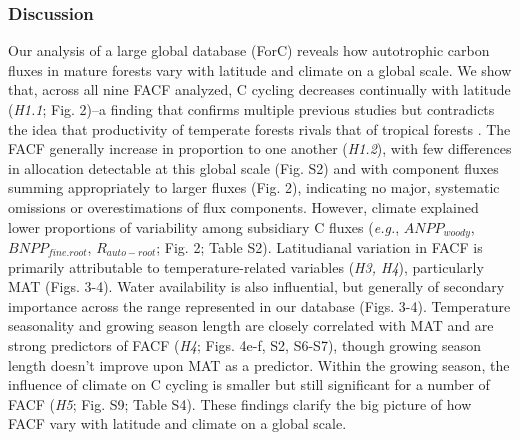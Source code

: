 \documentclass[]{article}
\begin{document}
\subsubsection{Discussion}\label{discussion}

Our analysis of a large global database (ForC) reveals how autotrophic
carbon fluxes in mature forests vary with latitude and climate on a
global scale. We show that, across all nine FACF analyzed, C cycling
decreases continually with latitude (\emph{H1.1}; Fig. 2)--a finding
that confirms multiple previous studies but contradicts the idea that
productivity of temperate forests rivals that of tropical forests
\citep{huston_global_2009}. The FACF generally increase in proportion to
one another (\emph{H1.2}), with few differences in allocation detectable
at this global scale (Fig. S2) and with component fluxes summing
appropriately to larger fluxes (Fig. 2), indicating no major, systematic
omissions or overestimations of flux components. However, climate
explained lower proportions of variability among subsidiary C fluxes
(\emph{e.g.}, \(ANPP_{woody}\), \(BNPP_{fine.root}\), \(R_{auto-root}\);
Fig. 2; Table S2). Latitudianal variation in FACF is primarily
attributable to temperature-related variables (\emph{H3, H4}),
particularly MAT (Figs. 3-4). Water availability is also influential,
but generally of secondary importance across the range represented in
our database (Figs. 3-4). Temperature seasonality and growing season
length are closely correlated with MAT and are strong predictors of FACF
(\emph{H4}; Figs. 4e-f, S2, S6-S7), though growing season length doesn't
improve upon MAT as a predictor. Within the growing season, the
influence of climate on C cycling is smaller but still significant for a
number of FACF (\emph{H5}; Fig. S9; Table S4). These findings clarify
the big picture of how FACF vary with latitude and climate on a global
scale.
\end{document}
